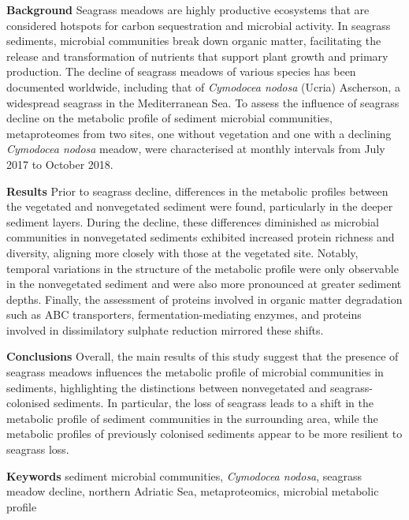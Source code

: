 \documentclass[
  12 pt,
]{article}
\begin{document}
{\setlength{\parskip}{0pt}

\noindent
\textbf{Background} Seagrass meadows are highly productive ecosystems that are considered hotspots for carbon sequestration and microbial activity. In seagrass sediments, microbial communities break down organic matter, facilitating the release and transformation
of nutrients that support plant growth and primary production. The decline of seagrass meadows of various species has been documented worldwide, including that of \emph{Cymodocea nodosa} (Ucria) Ascherson, a widespread seagrass in the Mediterranean Sea. To assess the influence of seagrass decline on the metabolic profile of sediment microbial communities, metaproteomes from two sites, one without vegetation and one with a declining \emph{Cymodocea nodosa} meadow, were characterised at monthly intervals from July 2017 to October 2018.

\noindent
\textbf{Results} Prior to seagrass decline, differences in the metabolic profiles between the vegetated and nonvegetated sediment were found, particularly in the deeper sediment layers. During the decline, these differences diminished as microbial communities in nonvegetated sediments exhibited increased protein richness and diversity, aligning more closely with those at the vegetated site. Notably, temporal variations in the structure of the metabolic profile were only observable in the nonvegetated sediment and were also more pronounced at greater sediment depths. Finally, the assessment of proteins involved in organic matter degradation such as ABC transporters, fermentation-mediating enzymes, and proteins involved in dissimilatory sulphate reduction mirrored these shifts.

\noindent
\textbf{Conclusions} Overall, the main results of this study suggest that the presence of seagrass meadows influences the metabolic profile of microbial communities in sediments, highlighting the distinctions between nonvegetated and seagrass-colonised sediments. In particular, the loss of seagrass leads to a shift in the metabolic profile of sediment communities in the surrounding area, while the metabolic profiles of previously colonised sediments appear to be more resilient to seagrass loss.

}

\noindent
\textbf{Keywords} sediment microbial communities, \emph{Cymodocea nodosa}, seagrass meadow decline, northern Adriatic Sea, metaproteomics, microbial metabolic profile

\newpage
\end{document}
